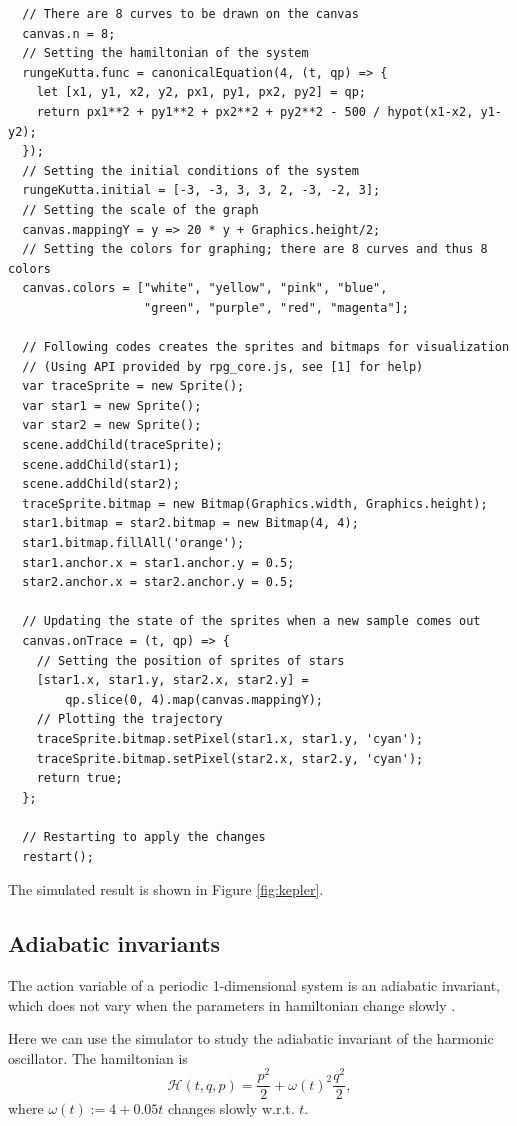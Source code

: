 \documentclass[12pt]{article}
\begin{document}
\begin{verbatim}
  // There are 8 curves to be drawn on the canvas
  canvas.n = 8;
  // Setting the hamiltonian of the system
  rungeKutta.func = canonicalEquation(4, (t, qp) => {
    let [x1, y1, x2, y2, px1, py1, px2, py2] = qp;
    return px1**2 + py1**2 + px2**2 + py2**2 - 500 / hypot(x1-x2, y1-y2);
  });
  // Setting the initial conditions of the system
  rungeKutta.initial = [-3, -3, 3, 3, 2, -3, -2, 3];
  // Setting the scale of the graph
  canvas.mappingY = y => 20 * y + Graphics.height/2;
  // Setting the colors for graphing; there are 8 curves and thus 8 colors
  canvas.colors = ["white", "yellow", "pink", "blue",
                   "green", "purple", "red", "magenta"];

  // Following codes creates the sprites and bitmaps for visualization
  // (Using API provided by rpg_core.js, see [1] for help)
  var traceSprite = new Sprite();
  var star1 = new Sprite();
  var star2 = new Sprite();
  scene.addChild(traceSprite);
  scene.addChild(star1);
  scene.addChild(star2);
  traceSprite.bitmap = new Bitmap(Graphics.width, Graphics.height);
  star1.bitmap = star2.bitmap = new Bitmap(4, 4);
  star1.bitmap.fillAll('orange');
  star1.anchor.x = star1.anchor.y = 0.5;
  star2.anchor.x = star2.anchor.y = 0.5;

  // Updating the state of the sprites when a new sample comes out
  canvas.onTrace = (t, qp) => {
    // Setting the position of sprites of stars
    [star1.x, star1.y, star2.x, star2.y] =
        qp.slice(0, 4).map(canvas.mappingY);
    // Plotting the trajectory
    traceSprite.bitmap.setPixel(star1.x, star1.y, 'cyan');
    traceSprite.bitmap.setPixel(star2.x, star2.y, 'cyan');
    return true;
  };

  // Restarting to apply the changes
  restart();
\end{verbatim}

The simulated result is shown in Figure \ref{fig:kepler}.

\subsection{Adiabatic invariants}

The action variable of a periodic 1-dimensional system is an adiabatic invariant,
which does not vary when the parameters in hamiltonian change slowly \cite[p. 298]{arnold1989mathmech}\cite[p. 156]{landau1976mechanics}.

Here we can use the simulator to study the adiabatic invariant of the harmonic oscillator.
The hamiltonian is
\begin{equation*}
  \mathcal H\left(t,q,p\right)=\frac{p^2}2+\omega\left(t\right)^2\frac{q^2}2,
\end{equation*}
where $\omega\left(t\right):=4+0.05t$ changes slowly w.r.t. $t$.
\end{document}
